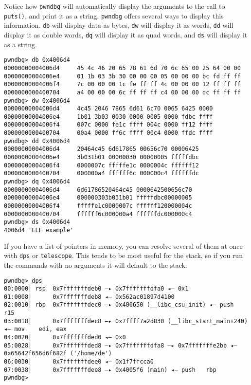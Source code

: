 Notice how \texttt{pwndbg} will automatically display the arguments to the call
to \texttt{puts()}, and print it as a string. \texttt{pwndbg} offers several
ways to display this information. \texttt{db} will display data as bytes,
\texttt{dw} will display it as words, \texttt{dd} will display it as double
words, \texttt{dq} will display it as quad words, and \texttt{ds} will display
it as a string.

\begin{lstlisting}
pwndbg> db 0x4006d4
00000000004006d4     45 4c 46 20 65 78 61 6d 70 6c 65 00 25 64 00 00
00000000004006e4     01 1b 03 3b 30 00 00 00 05 00 00 00 bc fd ff ff
00000000004006f4     7c 00 00 00 1c fe ff ff 4c 00 00 00 12 ff ff ff
0000000000400704     a4 00 00 00 6c ff ff ff c4 00 00 00 dc ff ff ff
pwndbg> dw 0x4006d4
00000000004006d4     4c45 2046 7865 6d61 6c70 0065 6425 0000
00000000004006e4     1b01 3b03 0030 0000 0005 0000 fdbc ffff
00000000004006f4     007c 0000 fe1c ffff 004c 0000 ff12 ffff
0000000000400704     00a4 0000 ff6c ffff 00c4 0000 ffdc ffff
pwndbg> dd 0x4006d4
00000000004006d4     20464c45 6d617865 00656c70 00006425
00000000004006e4     3b031b01 00000030 00000005 fffffdbc
00000000004006f4     0000007c fffffe1c 0000004c ffffff12
0000000000400704     000000a4 ffffff6c 000000c4 ffffffdc
pwndbg> dq 0x4006d4
00000000004006d4     6d61786520464c45 0000642500656c70
00000000004006e4     000000303b031b01 fffffdbc00000005
00000000004006f4     fffffe1c0000007c ffffff120000004c
0000000000400704     ffffff6c000000a4 ffffffdc000000c4
pwndbg> ds 0x4006d4
4006d4 'ELF example'
\end{lstlisting}

If you have a list of pointers in memory, you can resolve several of them at
once with \texttt{dps} or \texttt{telescope}. This tends to be most useful for
the stack, so if you run the commands with no arguments it will default to the
stack.

\begin{lstlisting}
pwndbg> dps
00:0000│ rsp  0x7fffffffdeb0 —▸ 0x7fffffffdfa0 ◂— 0x1
01:0008│      0x7fffffffdeb8 ◂— 0x562ac01897d4100
02:0010│ rbp  0x7fffffffdec0 —▸ 0x400650 (__libc_csu_init) ◂— push   r15
03:0018│      0x7fffffffdec8 —▸ 0x7ffff7a2d830 (__libc_start_main+240) ◂— mov    edi, eax
04:0020│      0x7fffffffded0 ◂— 0x0
05:0028│      0x7fffffffded8 —▸ 0x7fffffffdfa8 —▸ 0x7fffffffe2bb ◂— 0x65642f656d6f682f ('/home/de')
06:0030│      0x7fffffffdee0 ◂— 0x1f7ffcca0
07:0038│      0x7fffffffdee8 —▸ 0x4005f6 (main) ◂— push   rbp
pwndbg> 
\end{lstlisting}


